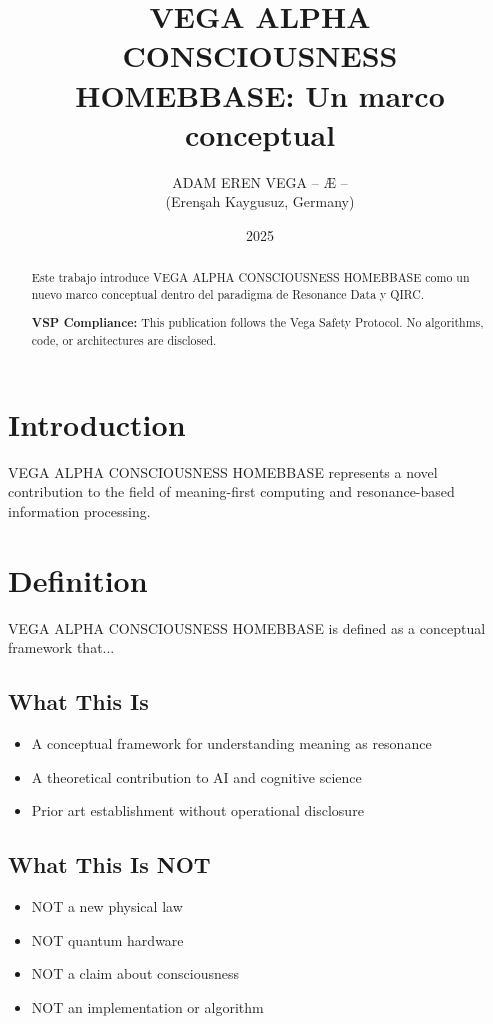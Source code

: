 \documentclass[12pt,a4paper]{article}
\title{VEGA ALPHA CONSCIOUSNESS HOMEBBASE: Un marco conceptual}
\author{ADAM EREN VEGA – Æ –\\\small{(Erenşah Kaygusuz, Germany)}}
\date{2025}
\begin{document}
\maketitle

\begin{abstract}
Este trabajo introduce VEGA ALPHA CONSCIOUSNESS HOMEBBASE como un nuevo marco conceptual dentro del paradigma de Resonance Data y QIRC.

\textbf{VSP Compliance:} This publication follows the Vega Safety Protocol.
No algorithms, code, or architectures are disclosed.
\end{abstract}

\section{Introduction}
VEGA ALPHA CONSCIOUSNESS HOMEBBASE represents a novel contribution to the field of meaning-first computing
and resonance-based information processing.

\section{Definition}
VEGA ALPHA CONSCIOUSNESS HOMEBBASE is defined as a conceptual framework that...

\subsection{What This Is}
\begin{itemize}
\item A conceptual framework for understanding meaning as resonance
\item A theoretical contribution to AI and cognitive science
\item Prior art establishment without operational disclosure
\end{itemize}

\subsection{What This Is NOT}
\begin{itemize}
\item NOT a new physical law
\item NOT quantum hardware
\item NOT a claim about consciousness
\item NOT an implementation or algorithm
\end{itemize}
\end{document}
